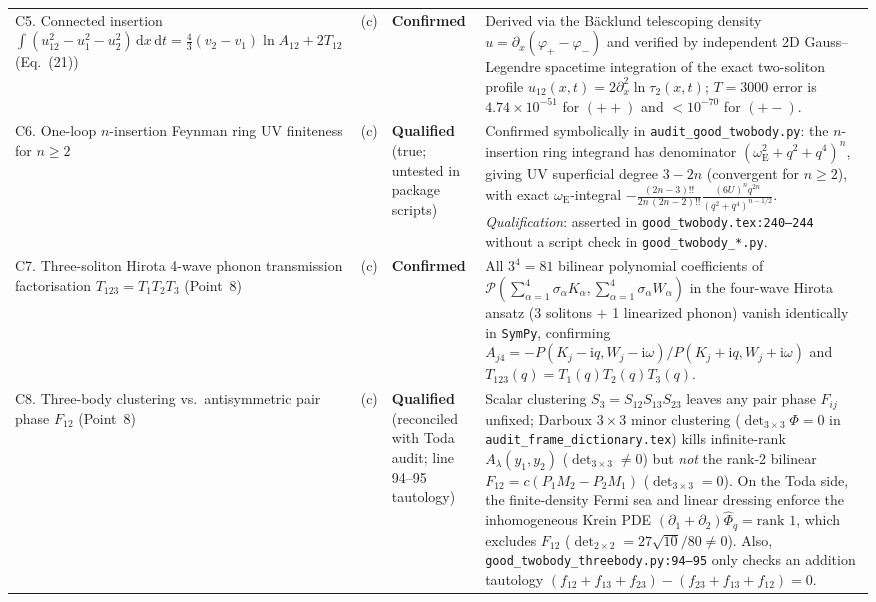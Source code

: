 \documentclass[11pt,a4paper]{article}
\newcommand{\dd}{\mathrm{d}}
\newcommand{\ii}{\mathrm{i}}
\begin{document}
\begin{center}
\begin{longtable}{@{}p{2.9cm}p{0.8cm}p{1.9cm}p{9.9cm}@{}}
\addlinespace
C5. Connected insertion $\int (u_{12}^2 - u_1^2 - u_2^2)\,\dd x\,\dd t = \frac{4}{3}(v_2-v_1)\ln A_{12} + 2T_{12}$ (Eq.~(21)) & (c) & \textbf{Confirmed} & Derived via the B\"acklund telescoping density $u = \partial_x(\varphi_+ - \varphi_-)$ and verified by independent 2D Gauss--Legendre spacetime integration of the exact two-soliton profile $u_{12}(x,t) = 2\partial_x^2\ln\tau_2(x,t)$; $T=3000$ error is $4.74\times 10^{-51}$ for $(++)$ and $<10^{-70}$ for $(+-)$. \\
\addlinespace
C6. One-loop $n$-insertion Feynman ring UV finiteness for $n\ge 2$ & (c) & \textbf{Qualified} (true; untested in package scripts) & Confirmed symbolically in \texttt{audit\_good\_twobody.py}: the $n$-insertion ring integrand has denominator $(\omega_{\mathrm{E}}^2 + q^2 + q^4)^n$, giving UV superficial degree $3-2n$ (convergent for $n\ge 2$), with exact $\omega_{\mathrm{E}}$-integral $-\frac{(2n-3)!!}{2n\,(2n-2)!!}\frac{(6U)^n q^{2n}}{(q^2+q^4)^{n-1/2}}$. \emph{Qualification}: asserted in \texttt{good\_twobody.tex:240--244} without a script check in \texttt{good\_twobody\_*.py}. \\
\addlinespace
C7. Three-soliton Hirota 4-wave phonon transmission factorisation $T_{123}=T_1 T_2 T_3$ (Point~8) & (c) & \textbf{Confirmed} & All $3^4=81$ bilinear polynomial coefficients of $\mathcal{P}(\sum_{\alpha=1}^4 \sigma_\alpha K_\alpha, \sum_{\alpha=1}^4 \sigma_\alpha W_\alpha)$ in the four-wave Hirota ansatz (3 solitons + 1 linearized phonon) vanish identically in \texttt{SymPy}, confirming $A_{j4} = -P(K_j-\ii q, W_j-\ii\omega)/P(K_j+\ii q, W_j+\ii\omega)$ and $T_{123}(q)=T_1(q)T_2(q)T_3(q)$. \\
\addlinespace
C8. Three-body clustering vs.\ antisymmetric pair phase $F_{12}$ (Point~8) & (c) & \textbf{Qualified} (reconciled with Toda audit; line 94--95 tautology) & Scalar clustering $S_3=S_{12}S_{13}S_{23}$ leaves any pair phase $F_{ij}$ unfixed; Darboux $3\times 3$ minor clustering ($\det_{3\times 3}\Phi=0$ in \texttt{audit\_frame\_dictionary.tex}) kills infinite-rank $A_\lambda(y_1,y_2)$ ($\det_{3\times 3}\neq 0$) but \emph{not} the rank-2 bilinear $F_{12}=c(P_1 M_2 - P_2 M_1)$ ($\det_{3\times 3}=0$). On the Toda side, the finite-density Fermi sea and linear dressing enforce the inhomogeneous Krein PDE $(\partial_1+\partial_2)\widehat{\Phi}_q = \text{rank }1$, which excludes $F_{12}$ ($\det_{2\times 2}=27\sqrt{10}/80\neq 0$). Also, \texttt{good\_twobody\_threebody.py:94--95} only checks an addition tautology $(f_{12}+f_{13}+f_{23})-(f_{23}+f_{13}+f_{12})=0$. \\

\end{longtable}
\end{center}
\end{document}
